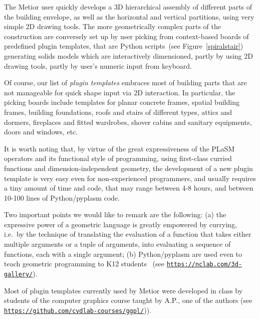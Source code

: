The Metior user quickly develops a 3D hierarchical assembly of different parts of the building envelope, as well as the horizontal and vertical partitions, using very simple 2D drawing tools. The more geometrically complex parts of the construction are conversely set up by user picking from context-based boards of predefined plugin templates, that are Python scripts~(see Figure~\ref{spiralstair}) generating solids models which are interactively dimensioned, partly by using 2D drawing tools, partly by user's numeric input from keyboard. 

Of course, our list of \emph{plugin templates} embraces most of building parts that are not manageable for quick shape input via 2D interaction. In particular, the picking boards include templates for planar concrete frames, spatial building frames, building foundations, roofs and stairs of different types, attics and dormers, fireplaces and fitted wardrobes, shover cabins and sanitary equipments, doors and windows, etc.

It is worth noting that, by virtue of the great expressiveness of the PLaSM operators and its functional style of programming, using first-class curried functions and dimension-independent geometry, the development of a new plugin template is very easy even for non-experienced programmers, and usually requires a tiny amount of time and code, that may range between 4-8 hours, and between 10-100 lines of Python/pyplasm code. 

Two important points we would like to remark are the following: (a) the expressive power of a geometric language is greatly empowered by  currying, i.e.~by the technique of translating the evaluation of a function that takes either multiple arguments or a tuple of arguments, into evaluating a sequence of functions, each with a single argument; (b) Python/pyplasm are used even to teach geometric programming to K12 students~\cite{ncLab} (see \href{https://nclab.com/3d-gallery/}{\texttt{https://nclab.com/3d-gallery/}}). 

Most of plugin templates currently used by Metior were developed in class by students of the computer  graphics course taught by A.P., one of the authors (see \href{https://github.com/cvdlab-courses/ggpl/blob/master/slides.md}{\texttt{https://github.com/cvdlab-courses/ggpl/}})). 



